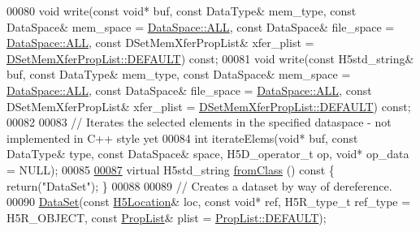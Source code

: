 \begin{DoxyCode}
00080         \textcolor{keywordtype}{void} write(\textcolor{keyword}{const} \textcolor{keywordtype}{void}* buf, \textcolor{keyword}{const} DataType& mem\_type, \textcolor{keyword}{const} DataSpace& mem\_space = 
      \hyperlink{class_h5_1_1_data_space_ae8a22405edd631eb923a327d39462ff2}{DataSpace::ALL}, \textcolor{keyword}{const} DataSpace& file\_space = \hyperlink{class_h5_1_1_data_space_ae8a22405edd631eb923a327d39462ff2}{DataSpace::ALL}, \textcolor{keyword}{const} 
      DSetMemXferPropList& xfer\_plist = \hyperlink{class_h5_1_1_d_set_mem_xfer_prop_list_ae69bf0ec7bccd4bb793ffe1ff770d8c4}{DSetMemXferPropList::DEFAULT}) \textcolor{keyword}{const};
00081         \textcolor{keywordtype}{void} write(\textcolor{keyword}{const} H5std\_string& buf, \textcolor{keyword}{const} DataType& mem\_type, \textcolor{keyword}{const} DataSpace& mem\_space = 
      \hyperlink{class_h5_1_1_data_space_ae8a22405edd631eb923a327d39462ff2}{DataSpace::ALL}, \textcolor{keyword}{const} DataSpace& file\_space = \hyperlink{class_h5_1_1_data_space_ae8a22405edd631eb923a327d39462ff2}{DataSpace::ALL}, \textcolor{keyword}{const} 
      DSetMemXferPropList& xfer\_plist = \hyperlink{class_h5_1_1_d_set_mem_xfer_prop_list_ae69bf0ec7bccd4bb793ffe1ff770d8c4}{DSetMemXferPropList::DEFAULT}) \textcolor{keyword}{const};
00082 
00083         \textcolor{comment}{// Iterates the selected elements in the specified dataspace - not implemented in C++ style yet}
00084         \textcolor{keywordtype}{int} iterateElems(\textcolor{keywordtype}{void}* buf, \textcolor{keyword}{const} DataType& type, \textcolor{keyword}{const} DataSpace& space, H5D\_operator\_t op, \textcolor{keywordtype}{void}* 
      op\_data = NULL);
00085 
\hyperlink{class_h5_1_1_data_set_a82b132213ea66c345e0533c34a0bd4c1}{00087}         \textcolor{keyword}{virtual} H5std\_string \hyperlink{class_h5_1_1_data_set_a82b132213ea66c345e0533c34a0bd4c1}{fromClass} ()\textcolor{keyword}{ const }\{ \textcolor{keywordflow}{return}(\textcolor{stringliteral}{"DataSet"}); \}
00088 
00089         \textcolor{comment}{// Creates a dataset by way of dereference.}
00090         \hyperlink{class_h5_1_1_data_set}{DataSet}(\textcolor{keyword}{const} \hyperlink{class_h5_1_1_h5_location}{H5Location}& loc, \textcolor{keyword}{const} \textcolor{keywordtype}{void}* ref, H5R\_type\_t ref\_type = H5R\_OBJECT, \textcolor{keyword}{
      const} \hyperlink{class_h5_1_1_prop_list}{PropList}& plist = \hyperlink{class_h5_1_1_prop_list_ae52af66ce82af0ea7e6dc57148c56241}{PropList::DEFAULT});

\end{DoxyCode}
